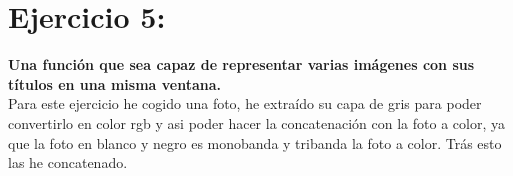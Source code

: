 \documentclass[11pt]{article}
\theoremstyle{definition}
\theoremstyle{remark}
\begin{document}
\section*{Ejercicio 5:}
\noindent
\textbf{Una función que sea capaz de representar varias imágenes con sus títulos en una misma ventana.}  
\\
Para este ejercicio he cogido una foto, he extraído su capa de gris para poder convertirlo en color rgb y asi poder hacer la concatenación con la foto a color, ya que la foto en blanco y negro es monobanda y tribanda la foto a color. Trás esto las he concatenado.
\end{document}
